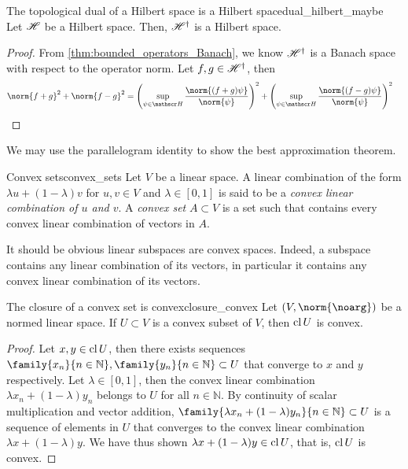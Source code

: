 \begin{theorem}{The topological dual of a Hilbert space is a Hilbert space}{dual_hilbert_maybe}
    Let \(\mathscr{H}\) be a Hilbert space. Then, \(\mathscr{H}^\dag\) is a Hilbert space.
\end{theorem}
\begin{proof}
From \cref{thm:bounded_operators_Banach}, we know \(\mathscr{H}^\dag\) is a Banach space with respect to the operator norm. Let \(f, g \in \mathscr{H}^\dag\), then
    \begin{align*}
        \norm{f + g}^2 + \norm{f - g}^2 &= \left(\sup_{\psi \in \hilbert}\frac{\norm{(f+g)\psi}}{\norm{\psi}}\right)^2 + \left(\sup_{\psi \in \hilbert}\frac{\norm{(f-g)\psi}}{\norm{\psi}}\right)^2
    \end{align*}
\end{proof}

We may use the parallelogram identity to show the best approximation theorem.
\begin{definition}{Convex sets}{convex_sets}
    Let \(V\) be a linear space. A linear combination of the form \(\lambda u + (1 - \lambda)v\) for \(u, v \in V\) and \(\lambda \in [0,1]\) is said to be a \emph{convex linear combination of \(u\) and \(v\)}. A \emph{convex set} \(A \subset V\) is a set such that contains every convex linear combination of vectors in \(A\).
\end{definition}
\begin{remark}
    It should be obvious linear subspaces are convex spaces. Indeed, a subspace contains any linear combination of its vectors, in particular it contains any convex linear combination of its vectors.
\end{remark}

\begin{proposition}{The closure of a convex set is convex}{closure_convex}
    Let \((V, \norm{\noarg})\) be a normed linear space. If \(U \subset V\) is a convex subset of \(V\), then \(\operatorname{cl}{U}\) is convex.
\end{proposition}
\begin{proof}
    Let \(x, y \in \operatorname{cl}{U}\), then there exists sequences \(\family{x_n}{n\in \mathbb{N}}, \family{y_n}{n\in \mathbb{N}} \subset U\) that converge to \(x\) and \(y\) respectively. Let \(\lambda \in [0,1]\), then the convex linear combination \(\lambda x_n + (1-\lambda)y_n\) belongs to \(U\) for all \(n \in \mathbb{N}\). By continuity of scalar multiplication and vector addition, \(\family{\lambda x_n + (1- \lambda)y_n}{n\in \mathbb{N}}\subset U\) is a sequence of elements in \(U\) that converges to the convex linear combination \(\lambda x + (1 - \lambda)y\). We have thus shown \(\lambda x + (1 - \lambda)y \in \operatorname{cl}{U}\), that is, \(\operatorname{cl}{U}\) is convex.
\end{proof}

